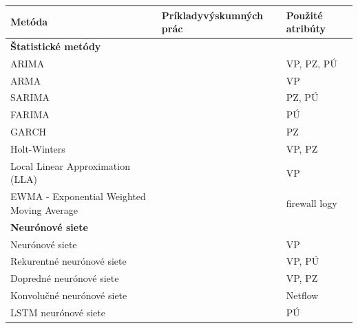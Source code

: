 \documentclass[thesismargins, thesislinespacing, openright, upjsfrontpage]{rnthesis}
\begin{document}
\begin{table}
    \centering
    \begin{tabular}{ | p{6cm} | p{4cm} | p{4cm} | }
         \hline \textbf{Metóda} & \textbf{Príklady\newline výskumných prác} & \textbf{Použité atribúty} \\

         \hline \multicolumn{2}{l}{\textbf{Štatistické metódy}} \\
         \hline ARIMA & \cite{madan2018predicting,papagiannaki2005long,condon2008analysis,roumani2015time,tang2018disclosure,tang2017big,pokhrel2017cybersecurity,werner2017time,cortez2012multi} & VP, PZ, PÚ \\
         \hline ARMA & \cite{wei2012intrusion,sang2002predictability} & VP \\
         \hline SARIMA & \cite{tang2016exploiting,condon2008analysis,roumani2015time,tang2018disclosure} & PZ, PÚ \\
         \hline FARIMA & \cite{zhan2015predicting} & PÚ \\
         \hline GARCH & \cite{tang2016exploiting,tang2018disclosure,tang2017big} & PZ \\
         \hline Holt-Winters & \cite{cortez2012multi,roumani2015time} & VP, PZ \\
         \hline Local Linear Approximation (LLA) & \cite{hasegawa2001applications} & VP \\
         \hline EWMA - Exponential Weighted Moving Average & \cite{soldo2011blacklisting} & firewall logy \\

         
         
         \hline \multicolumn{2}{l}{\textbf{Neurónové siete}} \\
         \hline Neurónové siete & \cite{Leau2015,wang2008internet} & VP \\
         \hline Rekurentné neurónové siete & \cite{madan2018predicting,fang2019deep} & VP, PÚ \\
         \hline Dopredné neurónové siete & \cite{cortez2012multi,pokhrel2017cybersecurity} & VP, PZ \\
         \hline Konvolučné neurónové siete & \cite{millar2019using} & Netflow \\
         \hline LSTM neurónové siete & \cite{fang2019deep} & PÚ \\
         

\end{tabular}
\end{table}
\end{document}
